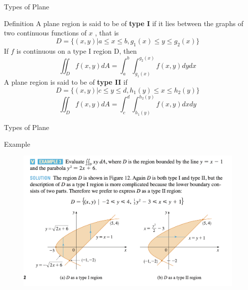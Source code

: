 \documentclass[aspectratio=169, UTF8]{beamer}
\begin{document}
\begin{frame}{Types of Plane}
    \begin{block}{Definition}
        A plane region is said to be of \textbf{type I} if it lies between the graphs of two continuous functions of $x$ , that is
        \begin{equation*}
            D=\{(x,y)|a\leq x\leq b, g_1(x)\leq y\leq g_2(x)\}
        \end{equation*}
        If $f$ is continuous on a type I region D, then
        \begin{equation*}
            \iint_Df(x,y)dA=\int_a^b\int_{g_1(x)}^{g_2(x)}f(x,y)dydx
        \end{equation*}
        A plane region is said to be of \textbf{type II} if
        \begin{equation*}
            D=\{(x,y)|c\leq y\leq d, h_1(y)\leq x\leq h_2(y)\}
        \end{equation*}
        \begin{equation*}
            \iint_Df(x,y)dA=\int_c^d\int_{h_1(y)}^{h_2(y)}f(x,y)dxdy
        \end{equation*}
    \end{block}
\end{frame}
\begin{frame}{Types of Plane}
    \begin{block}{Example}
        \begin{figure}
            \centering
            \includegraphics[width=0.5\linewidth]{TypeI&II_example.png}
            \label{fig:enter-label}
        \end{figure}
    \end{block}
\end{frame}
\end{document}
